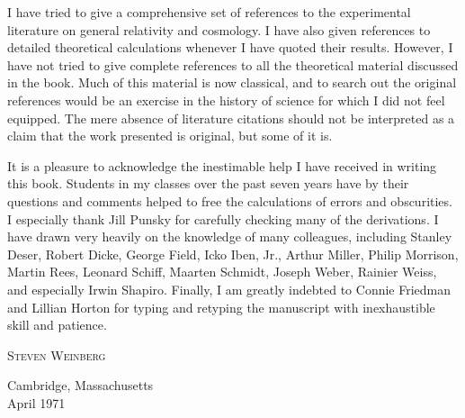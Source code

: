 I have tried to give a comprehensive set of references to the experimental
literature on general relativity and cosmology. I have also given references
to detailed theoretical calculations whenever I have quoted their results.
However, I have not tried to give complete references to all the theoretical
material discussed in the book. Much of this material is now classical, and to
search out the original references would be an exercise in the history of
science for which I did not feel equipped. The mere absence of literature
citations should not be interpreted as a claim that the work presented is
original, but some of it is.

It is a pleasure to acknowledge the inestimable help I have received in writing
this book. Students in my classes over the past seven years have by their
questions and comments helped to free the calculations of errors and
obscurities. I especially thank Jill Punsky for carefully checking many of the
derivations. I have drawn very heavily on the knowledge of many colleagues,
including Stanley Deser, Robert Dicke, George Field, Icko Iben, Jr., Arthur
Miller, Philip Morrison, Martin Rees, Leonard Schiff, Maarten Schmidt, Joseph
Weber, Rainier Weiss, and especially Irwin Shapiro. Finally, I am greatly
indebted to Connie Friedman and Lillian Horton for typing and retyping the
manuscript with inexhaustible skill and patience.

\begin{flushright}
\textsc{Steven Weinberg}
\end{flushright}

\noindent Cambridge, Massachusetts\\
April 1971
